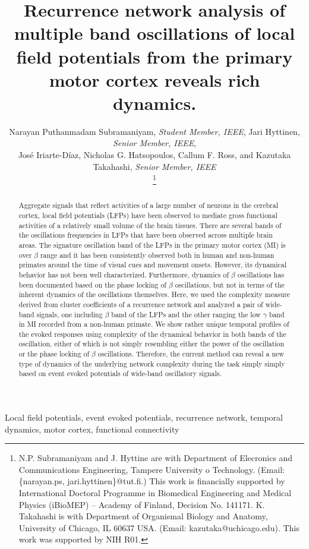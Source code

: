 \documentclass[letterpaper, 9pt, conference]{ieeeconf}
\title{\LARGE \bf
Recurrence network analysis of multiple band oscillations of local field potentials from the primary motor cortex reveals rich dynamics.
}
\author{Narayan Puthanmadam Subramaniyam, {\em Student Member, IEEE}, Jari Hyttinen, {\em Senior Member, IEEE}, \\
Jos\'{e} Iriarte-D\'{i}az, Nicholas G. Hatsopoulos, Callum F. Ross, and 
Kazutaka Takahashi, {\em Senior Member, IEEE} \\
\thanks{N.P. Subramaniyam and J. Hyttine are with Department of Elecronics and Communications Engineering, Tampere University o Technology. 
(Email: \{narayan.ps, jari.hyttinen\}@tut.fi.) This work is ﬁnancially supported by International Doctoral Programme in Biomedical Engineering and Medical Physics (iBioMEP) – Academy of Finland, Decision No. 141171. K. Takahashi is with Department of Organismal Biology and Anatomy, University of Chicago, IL 60637 USA. 
 (Email: kazutaka@uchicago.edu). This work was supported by NIH R01.}}
\begin{document}
\maketitle
\thispagestyle{empty}
\pagestyle{empty}



\begin{abstract}
Aggregate signals that reflect activities of a large number of neurons in the cerebral cortex, local field potentials (LFPs) have been observed to mediate gross functional activities of a relatively small volume of the brain tissues. There are several bands of the oscillations frequencies in LFPs that have been observed across multiple brain areas. 
The signature oscillation band of the LFPs in the primary motor cortex (MI) is over $\beta$ range and it has been consistently observed both in human and non-human primates around the time of visual cues and movement onsets. 
However, its dynamical behavior has not been well characterized. Furthermore, dynamics of $\beta$ oscillations has been documented based on the phase locking of $\beta$ oscillations, but not in terms of the inherent dynamics of the oscillations themselves. Here, we used the complexity measure derived from cluster coefficients of a recurrence network and analyzed a pair of wide-band signals, one including $\beta$ band of the LFPs and the other ranging the low $\gamma$ band  in MI recorded from a non-human primate. We show rather unique temporal profiles of the evoked responses using complexity of the dynamical behavior in both bands of the oscillation, either of which is not simply resembling either the power of the oscillation or the phase locking of $\beta$ oscillations. Therefore, the current method can reveal a new type
of dynamics of the underlying network complexity during the task simply simply based on event evoked potentials of wide-band oscillatory signals. 
\end{abstract}

\begin{keywords}
Local field potentials, event evoked potentials, recurrence network, temporal dynamics, motor cortex, functional connectivity
\end{keywords}
\end{document}
